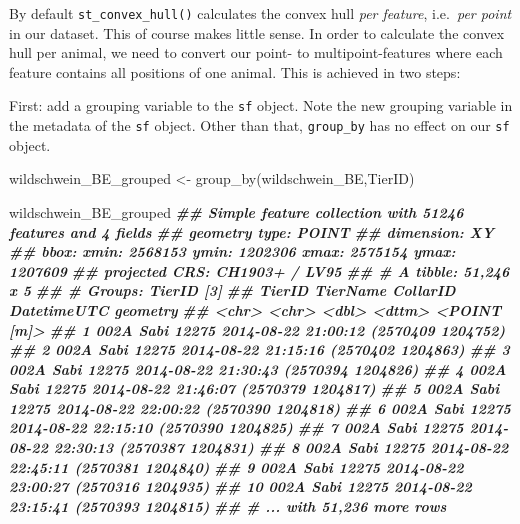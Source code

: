 \documentclass[
]{book}
\newenvironment{Shaded}{\begin{snugshade}}{\end{snugshade}}
\newcommand{\DocumentationTok}[1]{\textcolor[rgb]{0.56,0.35,0.01}{\textbf{\textit{#1}}}}
\newcommand{\FunctionTok}[1]{\textcolor[rgb]{0.00,0.00,0.00}{#1}}
\newcommand{\NormalTok}[1]{#1}
\newcommand{\OtherTok}[1]{\textcolor[rgb]{0.56,0.35,0.01}{#1}}
\begin{document}
By default \texttt{st\_convex\_hull()} calculates the convex hull \emph{per feature}, i.e.~\emph{per point} in our dataset. This of course makes little sense. In order to calculate the convex hull per animal, we need to convert our point- to multipoint-features where each feature contains all positions of one animal. This is achieved in two steps:

First: add a grouping variable to the \texttt{sf} object. Note the new grouping variable in the metadata of the \texttt{sf} object. Other than that, \texttt{group\_by} has no effect on our \texttt{sf} object.

\begin{Shaded}
\begin{Highlighting}[]

\NormalTok{wildschwein\_BE\_grouped }\OtherTok{\textless{}{-}} \FunctionTok{group\_by}\NormalTok{(wildschwein\_BE,TierID)}

\NormalTok{wildschwein\_BE\_grouped}
\DocumentationTok{\#\# Simple feature collection with 51246 features and 4 fields}
\DocumentationTok{\#\# geometry type:  POINT}
\DocumentationTok{\#\# dimension:      XY}
\DocumentationTok{\#\# bbox:           xmin: 2568153 ymin: 1202306 xmax: 2575154 ymax: 1207609}
\DocumentationTok{\#\# projected CRS:  CH1903+ / LV95}
\DocumentationTok{\#\# \# A tibble: 51,246 x 5}
\DocumentationTok{\#\# \# Groups:   TierID [3]}
\DocumentationTok{\#\#    TierID TierName CollarID DatetimeUTC                  geometry}
\DocumentationTok{\#\#    \textless{}chr\textgreater{}  \textless{}chr\textgreater{}       \textless{}dbl\textgreater{} \textless{}dttm\textgreater{}                    \textless{}POINT [m]\textgreater{}}
\DocumentationTok{\#\#  1 002A   Sabi        12275 2014{-}08{-}22 21:00:12 (2570409 1204752)}
\DocumentationTok{\#\#  2 002A   Sabi        12275 2014{-}08{-}22 21:15:16 (2570402 1204863)}
\DocumentationTok{\#\#  3 002A   Sabi        12275 2014{-}08{-}22 21:30:43 (2570394 1204826)}
\DocumentationTok{\#\#  4 002A   Sabi        12275 2014{-}08{-}22 21:46:07 (2570379 1204817)}
\DocumentationTok{\#\#  5 002A   Sabi        12275 2014{-}08{-}22 22:00:22 (2570390 1204818)}
\DocumentationTok{\#\#  6 002A   Sabi        12275 2014{-}08{-}22 22:15:10 (2570390 1204825)}
\DocumentationTok{\#\#  7 002A   Sabi        12275 2014{-}08{-}22 22:30:13 (2570387 1204831)}
\DocumentationTok{\#\#  8 002A   Sabi        12275 2014{-}08{-}22 22:45:11 (2570381 1204840)}
\DocumentationTok{\#\#  9 002A   Sabi        12275 2014{-}08{-}22 23:00:27 (2570316 1204935)}
\DocumentationTok{\#\# 10 002A   Sabi        12275 2014{-}08{-}22 23:15:41 (2570393 1204815)}
\DocumentationTok{\#\# \# ... with 51,236 more rows}
\end{Highlighting}
\end{Shaded}
\end{document}
